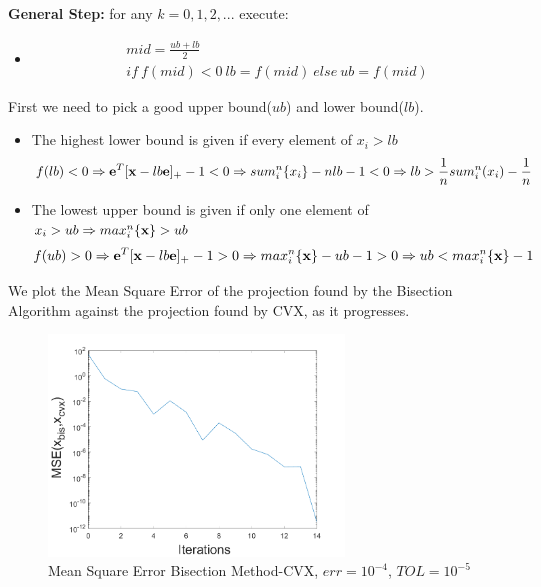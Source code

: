 \documentclass[12pt]{article}
\begin{document}
\begin{enumerate}
\begin{tcolorbox}
				{\bf General Step:} for any $k=0,1,2,...$ execute:
				\begin{itemize}
					\item \begin{align*}
						&mid=\frac{ub+lb}{2}\\
						&if\ f(mid)<0\ lb = f(mid)\ else\ ub = f(mid)
					\end{align*}
				\end{itemize}
			\end{tcolorbox}
		
			First we need to pick a good upper bound($ub$) and lower bound($lb$).
			\begin{itemize}
				\item The highest lower bound is given if every element of $x_i>lb$
				\begin{align*}
					f(lb)<0 \Rightarrow {\bf e}^T[{\bf x}-lb{\bf e}]_{+} - 1<0 \Rightarrow sum_i^n\{x_i\}-nlb - 1 < 0 \Rightarrow lb > \frac{1}{n}sum_i^n(x_i)-\frac{1}{n}
				\end{align*}
				
				\item The lowest upper bound is given if only one element of $x_i>ub\Rightarrow max_i^n\{{\bf x}\}>ub$  
				\begin{align*}
					f(ub)>0 \Rightarrow {\bf e}^T[{\bf x}-lb{\bf e}]_{+} - 1>0 \Rightarrow  max_i^n\{{\bf x}\}-ub-1>0 \Rightarrow ub<max_i^n\{{\bf x}\}-1
				\end{align*}
			\end{itemize}
		
			We plot the Mean Square Error of the projection found by the Bisection Algorithm against the projection found by CVX, as it progresses.
			
			\begin{figure}[h]
				\centering
				\includegraphics[width=0.7\textwidth]{P1-fig0.png}
				\caption{Mean Square Error Bisection Method-CVX, $err=10^{-4}$, $TOL=10^{-5}$}
			\end{figure}
			

\end{enumerate}
\end{document}
